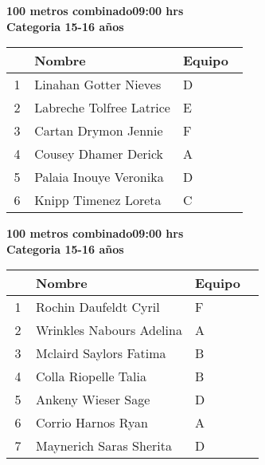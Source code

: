 \begin{minipage}{0.95\linewidth}\vspace{0.5cm} 
\begin{flushleft}
\textbf{
\hspace{-0.15cm}100 metros combinado\hspace{1.5cm}09:00 hrs \\Categoria 15-16 años}\vspace{-0.2cm} 
\end{flushleft}
\begin{tabular}{cp{0.63\linewidth}l}
\hline
& \textbf{Nombre} & \textbf{Equipo} \\ \hline
1 & Linahan Gotter Nieves & D \\ 
2 & Labreche Tolfree Latrice & E \\ 
3 & Cartan Drymon Jennie & F \\ 
4 & Cousey Dhamer Derick & A \\ 
5 & Palaia Inouye Veronika & D \\ 
6 & Knipp Timenez Loreta & C \\ 
\end{tabular}
\end{minipage}
\begin{minipage}{0.95\linewidth}\vspace{0.5cm} 
\begin{flushleft}
\textbf{
\hspace{-0.15cm}100 metros combinado\hspace{1.5cm}09:00 hrs \\Categoria 15-16 años}\vspace{-0.2cm} 
\end{flushleft}
\begin{tabular}{cp{0.63\linewidth}l}
\hline
& \textbf{Nombre} & \textbf{Equipo} \\ \hline
1 & Rochin Daufeldt Cyril & F \\ 
2 & Wrinkles Nabours Adelina & A \\ 
3 & Mclaird Saylors Fatima & B \\ 
4 & Colla Riopelle Talia & B \\ 
5 & Ankeny Wieser Sage & D \\ 
6 & Corrio Harnos Ryan & A \\ 
7 & Maynerich Saras Sherita & D \\ 
\end{tabular}
\end{minipage}
